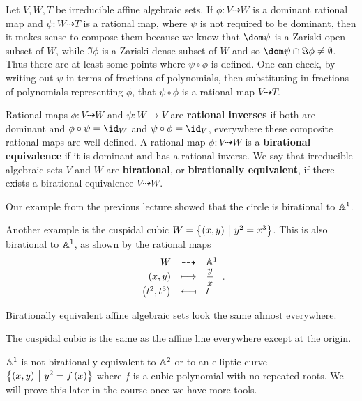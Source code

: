 Let $ V, W, T $ be irreducible affine algebraic sets. If $ \phi : V \dashrightarrow W $ is a dominant rational map and $ \psi : W \dashrightarrow T $ is a rational map, where $ \psi $ is not required to be dominant, then it makes sense to compose them because we know that $ \dom \psi $ is a Zariski open subset of $ W $, while $ \Im \phi $ is a Zariski dense subset of $ W $ and so $ \dom \psi \cap \Im \phi \ne \emptyset $. Thus there are at least some points where $ \psi \circ \phi $ is defined. One can check, by writing out $ \psi $ in terms of fractions of polynomials, then substituting in fractions of polynomials representing $ \phi $, that $ \psi \circ \phi $ is a rational map $ V \dashrightarrow T $.

\begin{definition*}
Rational maps $ \phi : V \dashrightarrow W $ and $ \psi : W \to V $ are \textbf{rational inverses} if both are dominant and $ \phi \circ \psi = \id_W $ and $ \psi \circ \phi = \id_V $, everywhere these composite rational maps are well-defined. A rational map $ \phi : V \dashrightarrow W $ is a \textbf{birational equivalence} if it is dominant and has a rational inverse. We say that irreducible algebraic sets $ V $ and $ W $ are \textbf{birational}, or \textbf{birationally equivalent}, if there exists a birational equivalence $ V \dashrightarrow W $.
\end{definition*}

\begin{example*}
Our example from the previous lecture showed that the circle is birational to $ \AA^1 $.
\end{example*}

\pagebreak

\begin{example*}
Another example is the cuspidal cubic $ W = \cbr{\br{x, y} \st y^2 = x^3} $. This is also birational to $ \AA^1 $, as shown by the rational maps
$$ \birational{W}{\AA^1}{\br{x, y}}{\dfrac{y}{x}}{\br{t^2, t^3}}{t}. $$
\end{example*}

Birationally equivalent affine algebraic sets look the same almost everywhere.

\begin{example*}
The cuspidal cubic is the same as the affine line everywhere except at the origin.
\end{example*}

\begin{example*}
$ \AA^1 $ is not birationally equivalent to $ \AA^2 $ or to an elliptic curve $ \cbr{\br{x, y} \st y^2 = f\br{x}} $ where $ f $ is a cubic polynomial with no repeated roots. We will prove this later in the course once we have more tools.
\end{example*}

